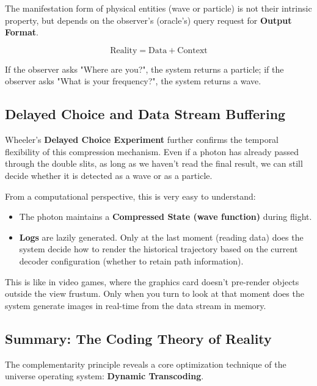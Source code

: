 \begin{theorem}
The manifestation form of physical entities (wave or particle) is not their intrinsic property, but depends on the observer's (oracle's) query request for \textbf{Output Format}.

\begin{equation}
\text{Reality} = \text{Data} + \text{Context}
\end{equation}

If the observer asks "Where are you?", the system returns a particle; if the observer asks "What is your frequency?", the system returns a wave.
\end{theorem}

\subsection{Delayed Choice and Data Stream Buffering}

Wheeler's \textbf{Delayed Choice Experiment} further confirms the temporal flexibility of this compression mechanism. Even if a photon has already passed through the double slits, as long as we haven't read the final result, we can still decide whether it is detected as a wave or as a particle.

From a computational perspective, this is very easy to understand:

\begin{itemize}
\item The photon maintains a \textbf{Compressed State (wave function)} during flight.

\item \textbf{Logs} are lazily generated. Only at the last moment (reading data) does the system decide how to render the historical trajectory based on the current decoder configuration (whether to retain path information).
\end{itemize}

This is like in video games, where the graphics card doesn't pre-render objects outside the view frustum. Only when you turn to look at that moment does the system generate images in real-time from the data stream in memory.

\subsection{Summary: The Coding Theory of Reality}

The complementarity principle reveals a core optimization technique of the universe operating system: \textbf{Dynamic Transcoding}.

